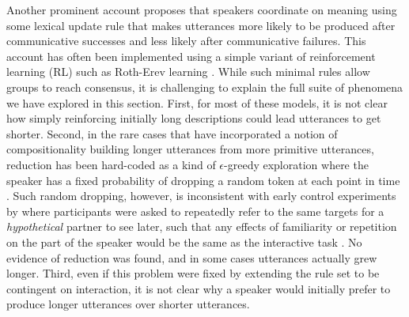 Another prominent account proposes that speakers coordinate on meaning using some lexical update rule that makes utterances more likely to be produced after communicative successes and less likely after communicative failures.
This account has often been implemented using a simple variant of reinforcement learning (RL) such as Roth-Erev learning \cite{erev1998predicting,steels_self-organizing_1995,barr_establishing_2004,young_evolution_2015}.
While such minimal rules allow groups to reach consensus, it is challenging to explain the full suite of phenomena we have explored in this section.
First, for most of these models, it is not clear how simply reinforcing initially long descriptions could lead utterances to get shorter. 
Second, in the rare cases that have incorporated a notion of compositionality building longer utterances from more primitive utterances, reduction has been hard-coded as a kind of $\epsilon$-greedy exploration where the speaker has a fixed probability of dropping a random token at each point in time \cite{beuls2013agent,steels2016agent}.
Such random dropping, however, is inconsistent with early control experiments by  where participants were asked to repeatedly refer to the same targets for a \emph{hypothetical} partner to see later, such that any effects of familiarity or repetition on the part of the speaker would be the same as the interactive task \cite<see also>{GarrodFayLeeOberlanderMacLeod07_GraphicalSymbolSystems}. 
No evidence of reduction was found, and in some cases utterances actually grew longer.
Third, even if this problem were fixed by extending the rule set to be contingent on interaction, it is not clear why a speaker would initially prefer to produce longer utterances over shorter utterances.

